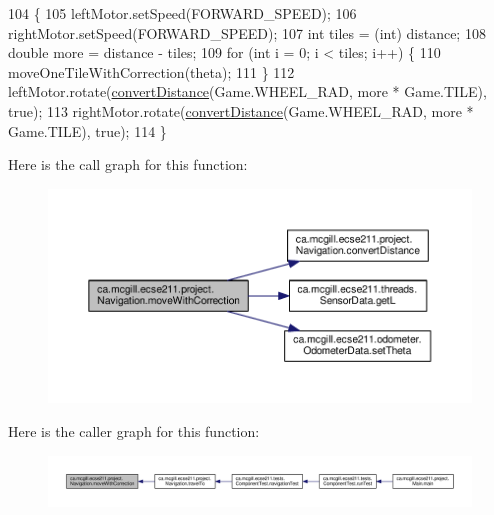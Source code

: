 \begin{DoxyCode}
104                                                                              \{
105     leftMotor.setSpeed(FORWARD\_SPEED);
106     rightMotor.setSpeed(FORWARD\_SPEED);
107     \textcolor{keywordtype}{int} tiles = (int) distance;
108     \textcolor{keywordtype}{double} more = distance - tiles;
109     \textcolor{keywordflow}{for} (\textcolor{keywordtype}{int} i = 0; i < tiles; i++) \{
110       moveOneTileWithCorrection(theta);
111     \}
112     leftMotor.rotate(\hyperlink{classca_1_1mcgill_1_1ecse211_1_1project_1_1_navigation_ac9e260bcd619ffa4820d7d0de7ea1c12}{convertDistance}(Game.WHEEL\_RAD, more * Game.TILE), \textcolor{keyword}{true});
113     rightMotor.rotate(\hyperlink{classca_1_1mcgill_1_1ecse211_1_1project_1_1_navigation_ac9e260bcd619ffa4820d7d0de7ea1c12}{convertDistance}(Game.WHEEL\_RAD, more * Game.TILE), \textcolor{keyword}{true});
114   \}
\end{DoxyCode}
Here is the call graph for this function\+:\nopagebreak
\begin{figure}[H]
\begin{center}
\leavevmode
\includegraphics[width=350pt]{classca_1_1mcgill_1_1ecse211_1_1project_1_1_navigation_a48eeb9ae2da23664421e8da5642054c7_cgraph}
\end{center}
\end{figure}
Here is the caller graph for this function\+:\nopagebreak
\begin{figure}[H]
\begin{center}
\leavevmode
\includegraphics[width=350pt]{classca_1_1mcgill_1_1ecse211_1_1project_1_1_navigation_a48eeb9ae2da23664421e8da5642054c7_icgraph}
\end{center}
\end{figure}
\mbox{\label{classca_1_1mcgill_1_1ecse211_1_1project_1_1_navigation_af2bddd9a34ea26cfd9a1e4ac055644dc}} 
